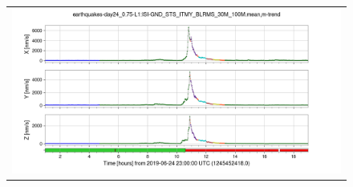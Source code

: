 \documentclass[colorlinks=true,pdfstartview=FitV,linkcolor=blue,
            citecolor=red,urlcolor=magenta]{ligodoc}
\begin{document}
\begin{figure}
\begin{minipage}[c]{0.67\textwidth}
\begin{tabular}{c}
      \includegraphics[width=\textwidth]{assets/report1/earthquakes-day24_075-L1:ISI-GND_STS_ITMY_BLRMS_30M_100Mmean,m-trend.png}
    \end{tabular}
  \end{minipage}
\end{figure}
\end{document}
